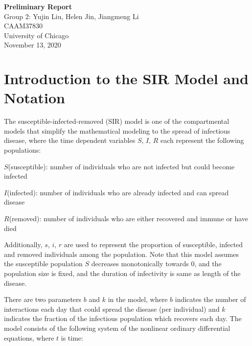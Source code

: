 \documentclass{article}
\begin{document}
\begin{titlepage}
  \begin{center}

    \huge
    \textbf{Preliminary Report}\\
    \vspace{4.5cm}
    \LARGE
    Group 2: Yujin Liu, Helen Jin, Jiangmeng Li\\
    \vspace{4.5cm}
    \Large
    CAAM37830\\
    \vspace{1cm}
    University of Chicago\\
    \vspace{1cm}
    November 13, 2020

  \end{center}

\end{titlepage}







\section{Introduction to the SIR Model and Notation}

The susceptible-infected-removed (SIR) model is one of the compartmental models that simplify the mathematical modeling to the spread of infectious disease, where the time dependent variables $S$, $I$, $R$ each represent the following populations:

$S$(susceptible): number of individuals who are not infected but could become infected

$I$(infected): number of individuals who are already infected and can spread disease

$R$(removed): number of individuals who are either recovered and immune or have died

Additionally, $s$, $i$, $r$ are used to represent the proportion of susceptible, infected and removed individuals among the population. Note that this model assumes the susceptible population $S$ decreases monotonically towards 0, and the population size is fixed, and the duration of infectivity is same as length of the disease.

There are two parameters $b$ and $k$ in the model, where $b$ indicates the number of interactions each day that could spread the disease (per individual) and $k$ indicates the fraction of the infectious population which recovers each day. The model consists of the following system of the nonlinear ordinary differential equations, where $t$ is time:
\end{document}
